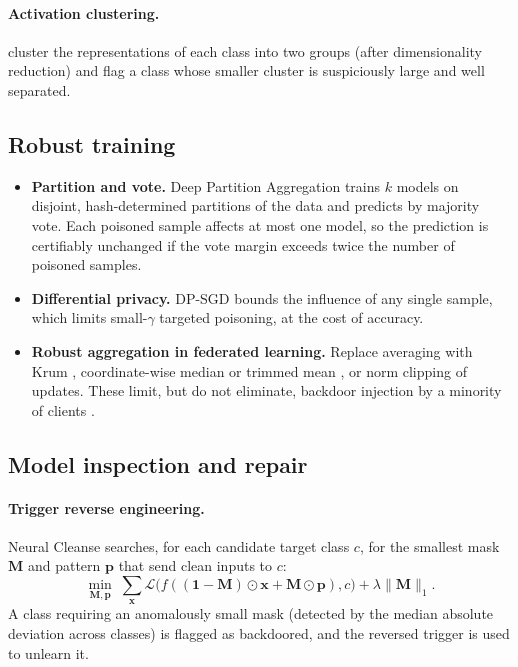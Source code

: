 \documentclass[10pt,a4paper]{extarticle}
\theoremstyle{definition}
\newcommand{\Loss}{\mathcal{L}}
\newcommand{\x}{\mathbf{x}}
\begin{document}
\paragraph{Activation clustering.} \citet{chen2019activation} cluster the representations of each class into two groups (after dimensionality reduction) and flag a class whose smaller cluster is suspiciously large and well separated.

\subsection{Robust training}

\begin{itemize}
  \item \textbf{Partition and vote.} Deep Partition Aggregation \citep{levine2021dpa} trains \(k\) models on disjoint, hash-determined partitions of the data and predicts by majority vote. Each poisoned sample affects at most one model, so the prediction is certifiably unchanged if the vote margin exceeds twice the number of poisoned samples.
  \item \textbf{Differential privacy.} DP-SGD bounds the influence of any single sample, which limits small-\(\gamma\) targeted poisoning, at the cost of accuracy.
  \item \textbf{Robust aggregation in federated learning.} Replace averaging with Krum \citep{blanchard2017krum}, coordinate-wise median or trimmed mean \citep{yin2018byzantine}, or norm clipping of updates. These limit, but do not eliminate, backdoor injection by a minority of clients \citep{bagdasaryan2020backdoor}.
\end{itemize}

\subsection{Model inspection and repair}

\paragraph{Trigger reverse engineering.} Neural Cleanse \citep{wang2019neural} searches, for each candidate target class \(c\), for the smallest mask \(\mathbf{M}\) and pattern \(\mathbf{p}\) that send clean inputs to \(c\):
\[
\min_{\mathbf{M},\mathbf{p}}\;\sum_{\x}\Loss\big(f((\mathbf{1}-\mathbf{M})\odot\x+\mathbf{M}\odot\mathbf{p}),c\big)+\lambda\|\mathbf{M}\|_1.
\]
A class requiring an anomalously small mask (detected by the median absolute deviation across classes) is flagged as backdoored, and the reversed trigger is used to unlearn it.
\end{document}
